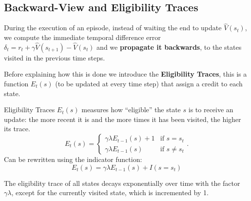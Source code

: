 \documentclass[10pt, a4paper]{report}
\begin{document}
\subsection{Backward-View and Eligibility Traces}
During the execution of an episode, instead of waiting the end to update $\hat V(s_t)$, we compute the immediate temporal difference error $\delta_t=r_t+\gamma \hat V(s_{t+1})-\hat V(s_{t})$  and we \textbf{propagate it backwards}, to the states visited in the previous time steps.

Before explaining how this is done we introduce the \textbf{Eligibility Traces}, this is a function $E_t(s)$ (to be updated at every time step) that assign a credit to each state.\begin{boxdefinition}{Eligibility Traces}{}
   $E_t(s)$ measures how ``eligible'' the state $s$ is to receive an update: the more recent it is and the more times it has been visited, the higher its trace.
   \begin{equation}
    E_t(s)=\begin{cases}
        \gamma\lambda E_{t-1}(s)+1&\text{if }s=s_t\\
        \gamma\lambda E_{t-1}(s)&\text{if }s\neq s_t
    \end{cases}.
   \end{equation}
   Can be rewritten using the indicator function:\begin{equation}
     E_t(s)=\gamma\lambda E_{t-1}(s)+I(s=s_t)
   \end{equation}
\end{boxdefinition}
The eligibility trace of all states decays exponentially over time with the factor $\gamma\lambda$, except for the currently visited state, which is incremented by 1. 
\end{document}
